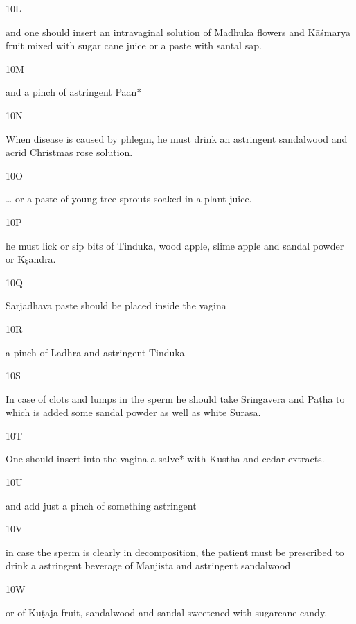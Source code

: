 \begin{translation}
\begin{tt}
\item[10L]

and one should insert an intravaginal solution of Madhuka flowers and 
  Kāśmarya fruit mixed with sugar cane juice or a paste with santal sap.
  
\item[10M]

and a pinch of astringent Paan*
  
  
\item[10N]

When disease is caused by phlegm, he must drink an astringent 
  sandalwood and acrid Christmas rose solution.
  
\item[10O]

… or a paste of young tree sprouts soaked in a plant juice.
  
\item[10P]

he must lick or sip bits of Tinduka, wood apple, slime apple and sandal 
  powder or Kṣandra.
  
\item[10Q]

 Sarjadhava paste should be placed inside the vagina
  
\item[10R]

a pinch of Ladhra and astringent Tinduka
  
\item[10S]

In case of clots and lumps in the sperm he should take Sringavera and 
  Pāṭhā to which is added some sandal powder as well as white Surasa.
  
\item[10T]

One should insert into the vagina a salve* with Kustha and cedar 
  extracts.
  
\item[10U]

and add just a pinch of something astringent
  
\item[10V]

in case the sperm is clearly in decomposition, the patient must be 
  prescribed to drink a astringent beverage of Manjista and astringent sandalwood
  
\item[10W]

or of Kuṭaja fruit, sandalwood and sandal sweetened with sugarcane 
  candy.
  

\end{tt}
\end{translation}
